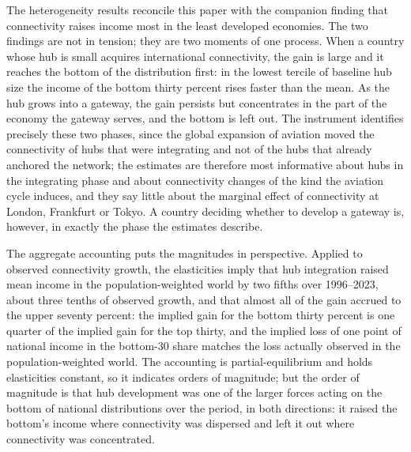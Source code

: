 The heterogeneity results reconcile this paper with the companion finding that connectivity raises income most in the least developed economies. The two findings are not in tension; they are two moments of one process. When a country whose hub is small acquires international connectivity, the gain is large and it reaches the bottom of the distribution first: in the lowest tercile of baseline hub size the income of the bottom thirty percent rises faster than the mean. As the hub grows into a gateway, the gain persists but concentrates in the part of the economy the gateway serves, and the bottom is left out. The instrument identifies precisely these two phases, since the global expansion of aviation moved the connectivity of hubs that were integrating and not of the hubs that already anchored the network; the estimates are therefore most informative about hubs in the integrating phase and about connectivity changes of the kind the aviation cycle induces, and they say little about the marginal effect of connectivity at London, Frankfurt or Tokyo. A country deciding whether to develop a gateway is, however, in exactly the phase the estimates describe.

The aggregate accounting puts the magnitudes in perspective. Applied to observed connectivity growth, the elasticities imply that hub integration raised mean income in the population-weighted world by two fifths over 1996--2023, about three tenths of observed growth, and that almost all of the gain accrued to the upper seventy percent: the implied gain for the bottom thirty percent is one quarter of the implied gain for the top thirty, and the implied loss of one point of national income in the bottom-30 share matches the loss actually observed in the population-weighted world. The accounting is partial-equilibrium and holds elasticities constant, so it indicates orders of magnitude; but the order of magnitude is that hub development was one of the larger forces acting on the bottom of national distributions over the period, in both directions: it raised the bottom's income where connectivity was dispersed and left it out where connectivity was concentrated.

